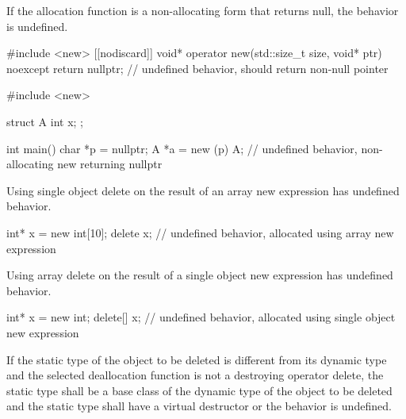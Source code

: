 
\pnum
If the allocation function is a non-allocating form
that returns null, the behavior is undefined.

\pnum
\begin{example}
\begin{codeblock}
#include <new>
[[nodiscard]] void* operator new(std::size_t size, void* ptr) noexcept {
  return nullptr;       // undefined behavior, should return non-null pointer
}
\end{codeblock}
\end{example}
\begin{example}
\begin{codeblock}
#include <new>

struct A {
  int x;
};

int main() {
  char *p = nullptr;
  A *a = new (p) A;     // undefined behavior, non-allocating new returning nullptr
}
\end{codeblock}
\end{example}

\pnum
Using single object delete on the result of an array new expression has undefined behavior.

\pnum
\begin{example}
\begin{codeblock}
int* x = new int[10];
delete x;           // undefined behavior, allocated using array new expression
\end{codeblock}
\end{example}

\pnum
Using array delete on the result of a single object new expression
has undefined behavior.

\pnum
\begin{example}
\begin{codeblock}
int* x = new int;
delete[] x;         // undefined behavior, allocated using single object new expression
\end{codeblock}
\end{example}


\pnum
If the static type of the object to be deleted
is different from its dynamic type
and the selected deallocation function
is not a destroying operator delete,
the static type shall be a base class
of the dynamic type of the object to be deleted
and the static type shall have a virtual destructor
or the behavior is undefined.


